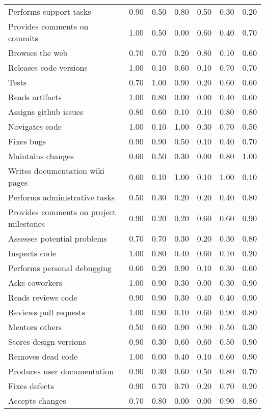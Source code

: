 \begin{tabular}{lrrrrrr}
Performs support tasks & 0.90 & 0.50 & 0.80 & 0.50 & 0.30 & 0.20 \\
Provides comments on commits & 1.00 & 0.50 & 0.00 & 0.60 & 0.40 & 0.70 \\
Browses the web & 0.70 & 0.70 & 0.20 & 0.80 & 0.10 & 0.60 \\
Releases code versions & 1.00 & 0.10 & 0.60 & 0.10 & 0.70 & 0.70 \\
Tests & 0.70 & 1.00 & 0.90 & 0.20 & 0.60 & 0.60 \\
Reads artifacts & 1.00 & 0.80 & 0.00 & 0.00 & 0.40 & 0.60 \\
Assigns github issues & 0.80 & 0.60 & 0.10 & 0.10 & 0.80 & 0.80 \\
Navigates code & 1.00 & 0.10 & 1.00 & 0.30 & 0.70 & 0.50 \\
Fixes bugs & 0.90 & 0.90 & 0.50 & 0.10 & 0.40 & 0.70 \\
Maintains changes & 0.60 & 0.50 & 0.30 & 0.00 & 0.80 & 1.00 \\
Writes documentation wiki pages & 0.60 & 0.10 & 1.00 & 0.10 & 1.00 & 0.10 \\
Performs administrative tasks & 0.50 & 0.30 & 0.20 & 0.20 & 0.40 & 0.80 \\
Provides comments on project milestones & 0.90 & 0.20 & 0.20 & 0.60 & 0.60 & 0.90 \\
Assesses potential problems & 0.70 & 0.70 & 0.30 & 0.20 & 0.30 & 0.80 \\
Inspects code & 1.00 & 0.80 & 0.40 & 0.60 & 0.10 & 0.20 \\
Performs personal debugging & 0.60 & 0.20 & 0.90 & 0.10 & 0.30 & 0.60 \\
Asks coworkers & 1.00 & 0.90 & 0.30 & 0.00 & 0.30 & 0.90 \\
Reads reviews code & 0.90 & 0.90 & 0.30 & 0.40 & 0.40 & 0.90 \\
Reviews pull requests & 1.00 & 0.90 & 0.10 & 0.60 & 0.90 & 0.80 \\
Mentors others & 0.50 & 0.60 & 0.90 & 0.90 & 0.50 & 0.30 \\
Stores design versions & 0.90 & 0.30 & 0.60 & 0.60 & 0.50 & 0.90 \\
Removes dead code & 1.00 & 0.00 & 0.40 & 0.10 & 0.60 & 0.90 \\
Produces user documentation & 0.90 & 0.30 & 0.60 & 0.50 & 0.80 & 0.70 \\
Fixes defects & 0.90 & 0.70 & 0.70 & 0.20 & 0.70 & 0.20 \\
Accepts changes & 0.70 & 0.80 & 0.00 & 0.00 & 0.90 & 0.80 \\

\end{tabular}
